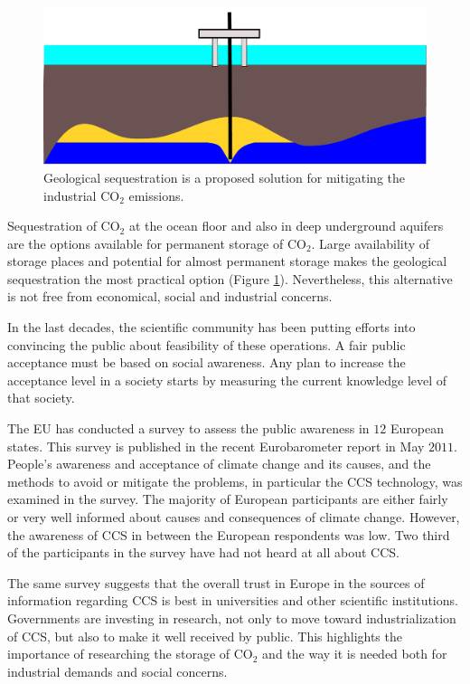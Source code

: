 \begin{figure}
  \centering
  \includegraphics[width=0.65 \linewidth]{./figurer/platform} 
  \caption{Geological sequestration is a proposed solution for mitigating the
industrial $\mbox{CO}_2$ emissions.}
  \label{fig:platform}
%
\end{figure}


Sequestration of CO$_2$ at the ocean floor and also in deep underground aquifers
are the options available for permanent storage of $\mbox{CO}_2$. Large
availability of storage places and potential for almost permanent storage makes
the geological sequestration the most practical option (Figure
\ref{fig:platform}). Nevertheless, this alternative is not free from economical,
social and industrial concerns.  

In the last decades, the scientific community has been putting efforts into
convincing the public about feasibility of these operations. A fair public
acceptance must be based on social awareness. Any plan to increase the
acceptance level in a society starts by measuring the current knowledge level of
that society. 

The EU has conducted a survey to assess the public awareness in $12$ European
states. This survey is published in the recent Eurobarometer report in May
$2011$. People's awareness and acceptance of climate change and its causes, and
the methods to avoid or mitigate the problems, in particular the CCS technology,
was examined in the survey. The majority of European participants are either
fairly or very well informed about causes and consequences of climate change.
However, the awareness of CCS in between the European respondents was low. Two
third of the participants in the survey have had not heard at all about CCS. 

The same survey suggests that the overall trust in Europe in the sources of
information regarding  CCS is best in universities and other scientific
institutions. Governments are investing in research, not only to move toward
industrialization of CCS, but also to make it well received by public. This
highlights the importance of researching the storage of $\mbox{CO}_2$ and the
way it is needed both for industrial demands and social concerns.

